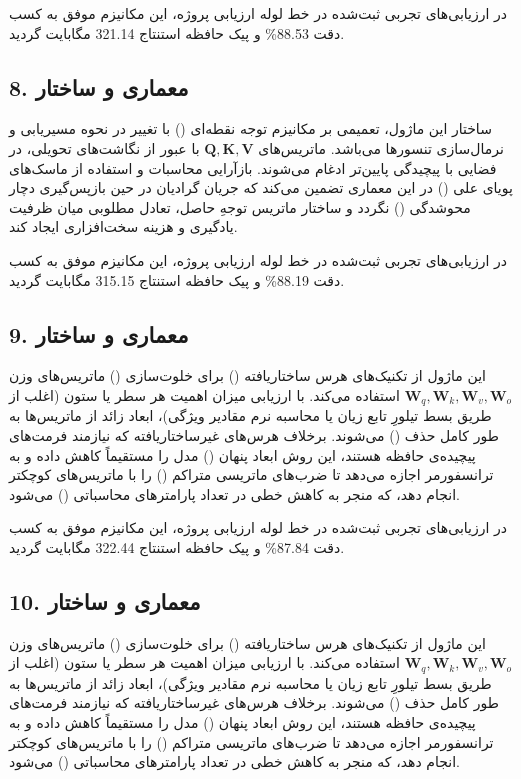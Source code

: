 \documentclass[12pt,a4paper]{report}
\theoremstyle{definition}
\begin{document}
در ارزیابی‌های تجربی ثبت‌شده در خط لوله ارزیابی پروژه، این مکانیزم موفق به کسب دقت 88.53\% و پیک حافظه استنتاج 321.14 مگابایت گردید.

\subsection*{8. معماری و ساختار }
ساختار این ماژول، تعمیمی بر مکانیزم توجه نقطه‌ای () با تغییر در نحوه مسیریابی و نرمال‌سازی تنسورها می‌باشد. ماتریس‌های $\mathbf{Q, K, V}$ با عبور از نگاشت‌های تحویلی، در فضایی با پیچیدگی پایین‌تر ادغام می‌شوند. بازآرایی محاسبات و استفاده از ماسک‌های پویای علی () در این معماری تضمین می‌کند که جریان گرادیان در حین بازپس‌گیری دچار محوشدگی () نگردد و ساختار ماتریس توجهِ حاصل، تعادل مطلوبی میان ظرفیت یادگیری و هزینه سخت‌افزاری ایجاد کند.

در ارزیابی‌های تجربی ثبت‌شده در خط لوله ارزیابی پروژه، این مکانیزم موفق به کسب دقت 88.19\% و پیک حافظه استنتاج 315.15 مگابایت گردید.

\subsection*{9. معماری و ساختار }
این ماژول از تکنیک‌های هرس ساختاریافته () برای خلوت‌سازی () ماتریس‌های وزن $\mathbf{W}_q, \mathbf{W}_k, \mathbf{W}_v, \mathbf{W}_o$ استفاده می‌کند. با ارزیابی میزان اهمیت هر سطر یا ستون (اغلب از طریق بسط تیلورِ تابع زیان یا محاسبه نرم مقادیر ویژگی)، ابعاد زائد از ماتریس‌ها به طور کامل حذف () می‌شوند. برخلاف هرس‌های غیرساختاریافته که نیازمند فرمت‌های پیچیده‌ی حافظه هستند، این روش ابعاد پنهان () مدل را مستقیماً کاهش داده و به ترانسفورمر اجازه می‌دهد تا ضرب‌های ماتریسی متراکم () را با ماتریس‌های کوچکتر انجام دهد، که منجر به کاهش خطی در تعداد پارامترهای محاسباتی () می‌شود.

در ارزیابی‌های تجربی ثبت‌شده در خط لوله ارزیابی پروژه، این مکانیزم موفق به کسب دقت 87.84\% و پیک حافظه استنتاج 322.44 مگابایت گردید.

\subsection*{10. معماری و ساختار }
این ماژول از تکنیک‌های هرس ساختاریافته () برای خلوت‌سازی () ماتریس‌های وزن $\mathbf{W}_q, \mathbf{W}_k, \mathbf{W}_v, \mathbf{W}_o$ استفاده می‌کند. با ارزیابی میزان اهمیت هر سطر یا ستون (اغلب از طریق بسط تیلورِ تابع زیان یا محاسبه نرم مقادیر ویژگی)، ابعاد زائد از ماتریس‌ها به طور کامل حذف () می‌شوند. برخلاف هرس‌های غیرساختاریافته که نیازمند فرمت‌های پیچیده‌ی حافظه هستند، این روش ابعاد پنهان () مدل را مستقیماً کاهش داده و به ترانسفورمر اجازه می‌دهد تا ضرب‌های ماتریسی متراکم () را با ماتریس‌های کوچکتر انجام دهد، که منجر به کاهش خطی در تعداد پارامترهای محاسباتی () می‌شود.
\end{document}
